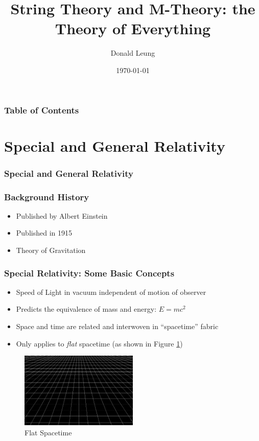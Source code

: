 \documentclass{beamer}
\title{String Theory and M-Theory: the Theory of Everything}
\author{Donald Leung}
\institute{Kellett School}
\date{\today}
\begin{document}
\begin{frame}
\titlepage
\end{frame}

\begin{frame}
\frametitle{Table of Contents}
\tableofcontents
\end{frame}

\section{Special and General Relativity}

\begin{frame}
\frametitle{Special and General Relativity}
\end{frame}

\begin{frame}
\frametitle{Background History}

\begin{itemize}
\item Published by Albert Einstein
\item Published in 1915
\item Theory of Gravitation
\end{itemize}

\end{frame}

\begin{frame}
\frametitle{Special Relativity: Some Basic Concepts}

\begin{itemize}
\item Speed of Light in vacuum independent of motion of observer
\item Predicts the equivalence of mass and energy: \begin{math}E=mc^2\end{math}
\item Space and time are related and interwoven in ``spacetime'' fabric
\item Only applies to \emph{flat} spacetime (as shown in Figure \ref{fig:flat})
\end{itemize}

\begin{figure}
\centering
\includegraphics[width=0.5\textwidth]{flat-spacetime.jpeg}
\caption{\label{fig:flat}Flat Spacetime}
\end{figure}

\end{frame}
\end{document}
